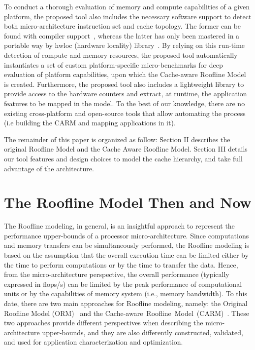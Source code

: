 \documentclass[twoside,twocolumn,8pt]{extarticle}
\begin{document}
To  conduct a thorough evaluation of memory and compute capabilities of a given platform, the proposed tool also includes the
necessary software support to detect both micro-architecture instruction set and cache topology. The former can be found with
compiler support~\cite{CompilerSupport}, whereas the latter has only been mastered in a portable way by hwloc (hardware locality)
library~\cite{broquedis:inria-00429889}.
By relying on this run-time detection of compute and memory resources, the proposed tool automatically instantiates a set of
custom platform-specific micro-benchmarks for deep evaluation of platform capabilities, upon which the Cache-aware Roofline Model
is created. Furthermore, the proposed tool also includes a lightweight library to provide access to the
hardware counters and extract, at runtime, the application features to be mapped in the model. To the best of our knowledge, there
are no existing cross-platform and open-source tools  that allow automating the process (i.e building the CARM and mapping
applications in it). 

The remainder of this paper is organized as follow: 
Section II describes the original Roofline Model and the Cache Aware Roofline Model.  Section III details our tool features and
design choices to model the cache hierarchy, and take full advantage of the architecture.

\section{The Roofline Model Then and Now}\label{sec:state_of_art}

The Roofline modeling, in general, is an insightful approach to represent the performance upper-bounds of a processor
micro-architecture. Since computations and memory transfers can be simultaneously performed, the Roofline modeling is based on the
assumption that the overall execution time can be limited either by the time to perform computations or by the time to transfer the
data. Hence, from the micro-architecture perspective, the overall performance (typically expressed in flops/s) can be limited by
the peak performance of computational units or by the capabilities of memory system (i.e., memory bandwidth). To this date, there
are two main approaches for Roofline modeling, namely: the Original Roofline Model (ORM)~\cite{Williams:2009:RIV:1498765.1498785}
and the Cache-aware~Roofline~Model~(CARM)~\cite{ilic2014cache}.
These two approaches provide different perspectives when describing the micro-architecture upper-bounds, and they are also
differently constructed, validated, and used for application characterization and optimization.
\end{document}

